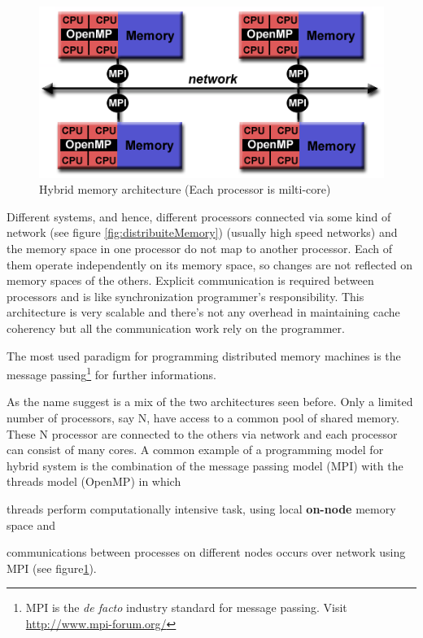 \begin{description}
\begin{itemize}
\end{itemize}

\begin{figure}
\centering
\includegraphics[scale=0.8]{./images/hybrid_model}
\caption{Hybrid memory architecture (Each processor is milti-core)}
\label{fig:hybridMemory}
\end{figure}

\item[Distributed Memory]
	Different systems, and hence, different processors connected via some
	kind of network (see figure \ref{fig:distribuiteMemory}) (usually high speed
	networks) and the memory space in one processor do not map to another processor. Each of them operate independently on its memory space,
	so changes are not reflected on memory spaces of the others. Explicit
	communication is required between processors and is like synchronization
	programmer's responsibility.
This architecture  is very scalable and there's not any overhead in maintaining
cache coherency but all the communication work rely on the programmer.

The most used paradigm for programming distributed memory machines is the
message passing\footnote{MPI is the \textit{de facto} industry standard for
message passing. Visit  \url{http://www.mpi-forum.org/}} for further
informations.

\item[Hybrid Systems] As the name suggest is a mix of the two architectures seen
before. Only a limited number of  processors, say N, have
access to a common pool of shared memory. These N processor are connected to the
others via network and each processor can consist of many cores.
A common example of a  programming model for hybrid system is the combination
of the message passing model (MPI) with the threads model (OpenMP) in which
\begin{inparaenum}
\item threads perform computationally intensive task, using local
\textbf{on-node} memory space and
\item communications between processes on different nodes occurs over network
using MPI (see figure\ref{fig:hybridMemory}).

\end{inparaenum} 
\end{description}


